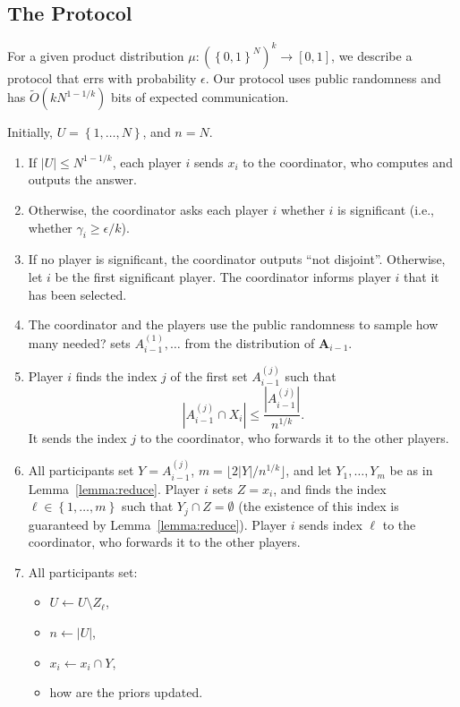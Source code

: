 \documentclass{article}
\newcommand{\set}[1]{\left\{#1\right\}}
\newcommand{\eps}{\epsilon}
\newcommand{\TODO}[1]{ {\color{red} #1 }}
\newcommand{\rv}[1]{\mathbf{#1}}
\theoremstyle{plain}
\begin{document}
\subsection{The Protocol}
For a given product distribution $\mu : \left(\set{0,1}^N\right)^k \rightarrow [0,1]$, we describe a protocol that errs with probability $\epsilon$.
Our protocol uses public randomness and has $\tilde{O}(kN^{1-1/k})$ bits of expected communication.

Initially, $U = \set{1,\ldots,N}$, and $n = N$.
\begin{enumerate}[(1)]
  \item If $|U| \leq N^{1 - 1/k}$, each player $i$ sends $x_i$ to the coordinator, who computes and outputs the answer.
  \item Otherwise, the coordinator asks each player $i$ whether $i$ is significant (i.e., whether $\gamma_i \geq \eps / k$).
  \item If no player is significant, the coordinator outputs ``not disjoint''. Otherwise, let $i$ be the
    first significant player. The coordinator informs player $i$ that it has been selected.
  \item The coordinator and the players use the public randomness to sample \TODO{how many needed?}
    sets $A_{i-1}^{(1)},\ldots$ from the distribution of $\rv{A}_{i-1}$.
  \item Player $i$ finds the index $j$ of the first set $A_{i-1}^{(j)}$ such that
    \begin{equation*}
      |A_{i-1}^{(j)} \cap X_i| \leq \frac{|A_{i-1}^{(j)}|}{n^{1/k}}.
    \end{equation*}
    It sends the index $j$ to the coordinator, who forwards it to the other players.
  \item All participants set $Y = A_{i-1}^{(j)}$, $m = \lfloor 2|Y| / n^{1/k} \rfloor$,
    and let $Y_1,\ldots,Y_m$ be as in Lemma~\ref{lemma:reduce}.
    Player $i$ sets $Z = x_i$, and finds the index $\ell \in \set{1,\ldots,m}$
    such that $Y_j \cap Z = \emptyset$ (the existence of this index is guaranteed by Lemma~\ref{lemma:reduce}).
    Player $i$ sends index $\ell$ to the coordinator, who forwards it to the other players.
  \item All participants set:
    \begin{itemize}
      \item $U \leftarrow U \setminus Z_{\ell}$,
      \item $n \leftarrow |U|$,
      \item $x_i \leftarrow x_i \cap Y$,
      \item \TODO{how are the priors updated.}
    \end{itemize}
\end{enumerate}
\end{document}
